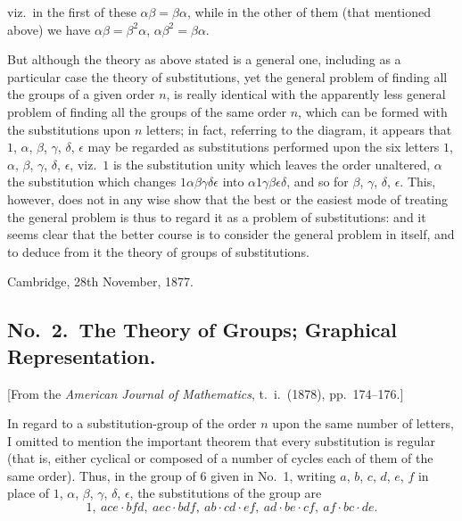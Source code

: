 \documentclass[11pt,a4paper]{book}
\begin{document}
\clearpage
viz.\ in the first of these $\alpha\beta = \beta\alpha$, while in the other of them (that mentioned above) we have $\alpha\beta = \beta^2\alpha$, $\alpha\beta^2 = \beta\alpha$.

But although the theory as above stated is a general one, including as a particular case the theory of substitutions, yet the general problem of finding all the groups of a given order $n$, is really identical with the apparently less general problem of finding all the groups of the same order $n$, which can be formed with the substitutions upon $n$ letters; in fact, referring to the diagram, it appears that $1$, $\alpha$, $\beta$, $\gamma$, $\delta$, $\epsilon$ may be regarded as substitutions performed upon the six letters $1$, $\alpha$, $\beta$, $\gamma$, $\delta$, $\epsilon$, viz.\ $1$ is the substitution unity which leaves the order unaltered, $\alpha$ the substitution which changes $1\alpha\beta\gamma\delta\epsilon$ into $\alpha 1\gamma\beta\epsilon\delta$, and so for $\beta$, $\gamma$, $\delta$, $\epsilon$. This, however, does not in any wise show that the best or the easiest mode of treating the general problem is thus to regard it as a problem of substitutions: and it seems clear that the better course is to consider the general problem in itself, and to deduce from it the theory of groups of substitutions.

Cambridge, 28th November, 1877.

\subsection*{No.\ 2.\ The Theory of Groups; Graphical Representation.}

[From the \textit{American Journal of Mathematics}, t.\ i.\ (1878), pp.\ 174--176.]

\medskip

In regard to a substitution-group of the order $n$ upon the same number of letters, I omitted to mention the important theorem that every substitution is regular (that is, either cyclical or composed of a number of cycles each of them of the same order). Thus, in the group of 6 given in No.\ 1, writing $a$, $b$, $c$, $d$, $e$, $f$ in place of $1$, $\alpha$, $\beta$, $\gamma$, $\delta$, $\epsilon$, the substitutions of the group are
\[
1, \ ace \cdot bfd, \ aec \cdot bdf, \ ab \cdot cd \cdot ef, \ ad \cdot be \cdot cf, \ af \cdot bc \cdot de.
\]
\end{document}
